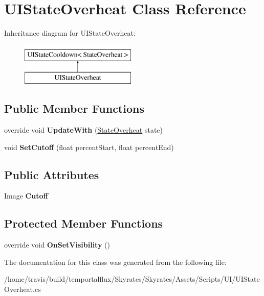 \hypertarget{class_u_i_state_overheat}{\section{U\-I\-State\-Overheat Class Reference}
\label{class_u_i_state_overheat}
}
Inheritance diagram for U\-I\-State\-Overheat\-:\begin{figure}[H]
\begin{center}
\leavevmode
\includegraphics[height=2.000000cm]{class_u_i_state_overheat}
\end{center}
\end{figure}
\subsection*{Public Member Functions}
\begin{DoxyCompactItemize}
\item 
\hypertarget{class_u_i_state_overheat_a07de1cab08401ad2ec522996fd005511}{override void {\bfseries Update\-With} (\hyperlink{class_skyrates_1_1_misc_1_1_state_overheat}{State\-Overheat} state)}\label{class_u_i_state_overheat_a07de1cab08401ad2ec522996fd005511}

\item 
\hypertarget{class_u_i_state_overheat_a898c47c1051144dfa3f76965004eab6e}{void {\bfseries Set\-Cutoff} (float percent\-Start, float percent\-End)}\label{class_u_i_state_overheat_a898c47c1051144dfa3f76965004eab6e}

\end{DoxyCompactItemize}
\subsection*{Public Attributes}
\begin{DoxyCompactItemize}
\item 
\hypertarget{class_u_i_state_overheat_a9d6c4efe5ccb7967bfee450329a6944e}{Image {\bfseries Cutoff}}\label{class_u_i_state_overheat_a9d6c4efe5ccb7967bfee450329a6944e}

\end{DoxyCompactItemize}
\subsection*{Protected Member Functions}
\begin{DoxyCompactItemize}
\item 
\hypertarget{class_u_i_state_overheat_a01117e928327ef01b0b35d64de8ceee5}{override void {\bfseries On\-Set\-Visibility} ()}\label{class_u_i_state_overheat_a01117e928327ef01b0b35d64de8ceee5}

\end{DoxyCompactItemize}


The documentation for this class was generated from the following file\-:\begin{DoxyCompactItemize}
\item 
/home/travis/build/temportalflux/\-Skyrates/\-Skyrates/\-Assets/\-Scripts/\-U\-I/U\-I\-State\-Overheat.\-cs\end{DoxyCompactItemize}
